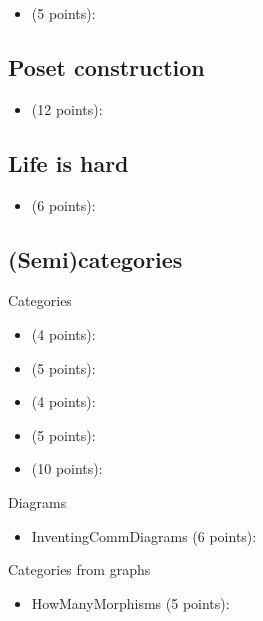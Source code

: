 \begin{itemize}
    \item {} (5 points): 
\end{itemize}

\subsection{Poset construction}
\begin{itemize}
    \item {} (12 points): 
\end{itemize}

\subsection{Life is hard}
\begin{itemize}
    \item {} (6 points): 
\end{itemize}

\subsection{(Semi)categories}

Categories
\begin{itemize}
    \item {} (4 points): 
    \item {} (5 points): 
    \item {} (4 points): 
    \item {} (5 points): 
    \item {} (10 points): 
\end{itemize}

Diagrams
\begin{itemize}
    \item InventingCommDiagrams (6 points): 
\end{itemize}

Categories from graphs
\begin{itemize}
    \item HowManyMorphisms (5 points): 
\end{itemize}

